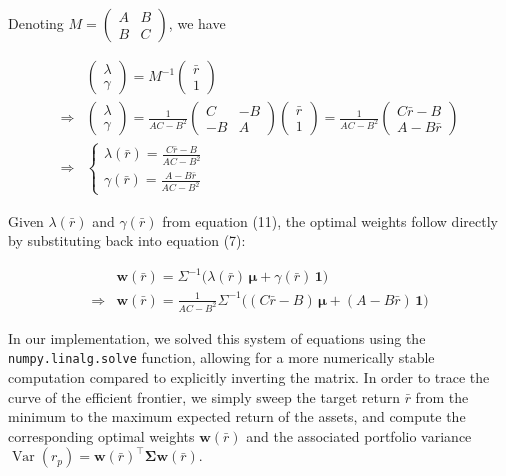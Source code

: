 \documentclass{article}
\DeclareMathOperator{\Var}{Var}
\newcommand{\bw}{\mathbf{w}}
\newcommand{\bSigma}{\boldsymbol{\Sigma}}
\begin{document}
Denoting $M = \begin{pmatrix} A & B \\ B & C \end{pmatrix}$, we have

\begin{equation}
    \begin{aligned}
        &\begin{pmatrix} \lambda \\ \gamma \end{pmatrix} = M^{-1}\begin{pmatrix} \bar r \\ 1 \end{pmatrix} \\
        \Rightarrow & \begin{pmatrix} \lambda \\ \gamma \end{pmatrix} = \frac{1}{AC - B^2}\begin{pmatrix} C & -B \\ -B & A \end{pmatrix}\begin{pmatrix} \bar r \\ 1 \end{pmatrix} = \frac{1}{AC - B^2}\begin{pmatrix} C\bar r - B \\ A - B\bar r \end{pmatrix} \\
        \Rightarrow & \begin{cases} \lambda(\bar r) = \frac{C\bar r - B}{AC - B^2} \\ \gamma(\bar r) = \frac{A - B\bar r}{AC - B^2} \end{cases}
    \end{aligned}
\end{equation}

\vspace{1em}

Given $\lambda(\bar r)$ and $\gamma(\bar r)$ from equation (11), the optimal weights follow directly by substituting back into equation (7):

\begin{equation}
    \begin{aligned}
        & \mathbf{w}(\bar r) = \Sigma^{-1}\big(\lambda(\bar r)\,\boldsymbol{\mu} + \gamma(\bar r)\,\mathbf{1}\big) \\
        \Rightarrow & \mathbf{w}(\bar r) = \frac{1}{AC - B^2}\Sigma^{-1}\big((C\bar r - B)\,\boldsymbol{\mu} + (A - B\bar r)\,\mathbf{1}\big)
    \end{aligned}
\end{equation}

In our implementation, we solved this system of equations using the \texttt{numpy.linalg.solve} function, allowing for a more numerically stable computation compared to explicitly inverting the matrix.
\vspace{2em}
In order to trace the curve of the efficient frontier, we simply sweep the target return $\bar r$ from the minimum to the maximum expected return of the assets, and compute the corresponding optimal weights $\bw(\bar r)$ and the associated portfolio variance $\Var(r_p) = \bw(\bar r)^\top \bSigma \bw(\bar r)$.
\end{document}
